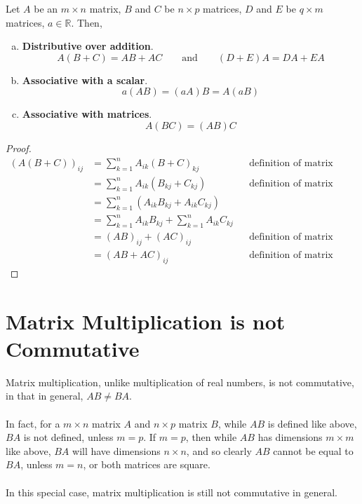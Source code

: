 \documentclass[letterpaper,12pt]{article}
\begin{document}
\begin{theorem}
Let $A$ be an $m \times n$ matrix, $B$ and $C$ be $n \times p$ matrices, $D$ and $E$ be $q \times m$ matrices, $a \in \mathbb{R}$. Then,
\begin{enumerate}[(a)]
    \item \textbf{Distributive over addition}.
    \begin{equation*}
        A(B + C) = AB + AC \qquad \text{and} \qquad (D + E)A = DA + EA
    \end{equation*}
    \item \textbf{Associative with a scalar}.
    \begin{equation*}
        a(AB) = (aA)B = A(aB)
    \end{equation*}
    \item \textbf{Associative with matrices}.
    \begin{equation*}
        A(BC) = (AB)C
    \end{equation*}
\end{enumerate}
\end{theorem}
\begin{proof}
\begin{align*}
    (A(B + C))_{ij} & = \sum_{k=1}^n A_{ik}(B + C)_{kj} && \text{definition of matrix multiplication} \\
    & = \sum_{k=1}^n A_{ik}(B_{kj} + C_{kj}) && \text{definition of matrix addition} \\
    & = \sum_{k=1}^n (A_{ik} B_{kj} + A_{ik} C_{kj}) \\
    & = \sum_{k=1}^n A_{ik}B_{kj} + \sum_{k=1}^n A_{ik}C_{kj} \\
    & = (AB)_{ij} + (AC)_{ij} && \text{definition of matrix multiplication} \\
    & = (AB + AC)_{ij} && \text{definition of matrix addition}
\end{align*}
\end{proof}

\section*{Matrix Multiplication is not Commutative}
Matrix multiplication, unlike multiplication of real numbers, is not commutative, in that in general, $AB \neq BA$.
\\ \\ In fact, for a $m \times n$ matrix $A$ and $n \times p$ matrix $B$, while $AB$ is defined like above, $BA$ is not defined, unless $m = p$. If $m = p$, then while $AB$ has dimensions $m \times m$ like above, $BA$ will have dimensions $n \times n$, and so clearly $AB$ cannot be equal to $BA$, unless $m = n$, or both matrices are square.
\\ \\ In this special case, matrix multiplication is still not commutative in general.
\end{document}
